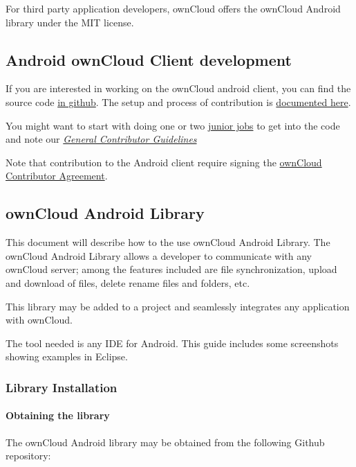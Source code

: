 \documentclass[letterpaper,10pt,english]{sphinxmanual}
\begin{document}
For third party application developers, ownCloud offers the ownCloud Android
library under the MIT license.


\subsection{Android ownCloud Client development}
\label{android_library/index:android-owncloud-client-development}
If you are interested in working on the ownCloud android client, you can find
the source code \href{https://github.com/owncloud/android/}{in github}. The
setup and process of contribution is
\href{https://github.com/owncloud/android/blob/master/SETUP.md}{documented here}.

You might want to start with doing one or two \href{https://github.com/owncloud/android/issues?q=is\%3Aopen+is\%3Aissue+label\%3A\%22Junior+Job\%22}{junior jobs}
to get into the code and note our {\hyperref[general/index::doc]{\emph{\emph{General Contributor Guidelines}}}}

Note that contribution to the Android client require signing the \href{https://owncloud.org/contribute/agreement/}{ownCloud Contributor Agreement}.


\subsection{ownCloud Android Library}
\label{android_library/index:owncloud-android-library}
This document will describe how to the use ownCloud Android Library.  The
ownCloud Android Library allows a developer to communicate with any ownCloud
server; among the features included are file synchronization, upload and
download of files, delete rename files and folders, etc.

This library may be added to a project and seamlessly integrates any
application with ownCloud.

The tool needed is any IDE for Android. This guide includes some screenshots
showing examples in Eclipse.


\subsubsection{Library Installation}
\label{android_library/library_installation:library-installation}\label{android_library/library_installation::doc}

\paragraph{Obtaining the library}
\label{android_library/library_installation:obtaining-the-library}
The ownCloud Android library may be obtained from the following Github repository:
\end{document}
